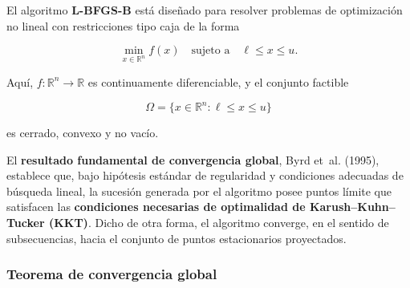 \documentclass[
  spanish,
  us-letterpaper,
  DIV=11,
  numbers=noendperiod]{scrreprt}
\numberwithin{equation}{section}
\begin{document}
El algoritmo \textbf{L-BFGS-B} está diseñado para resolver problemas de
optimización no lineal con restricciones tipo caja de la forma

\[
\min_{x \in \mathbb{R}^n} f(x)
\quad \text{sujeto a} \quad \ell \le x \le u. \tag{3.60}
\]

Aquí, \(f : \mathbb{R}^n \to \mathbb{R}\) es continuamente
diferenciable, y el conjunto factible

\[
\Omega = \{x \in \mathbb{R}^n : \ell \le x \le u\}
\]

es cerrado, convexo y no vacío.

El \textbf{resultado fundamental de convergencia global}, Byrd et~al.
(1995), establece que, bajo hipótesis estándar de regularidad y
condiciones adecuadas de búsqueda lineal, la sucesión generada por el
algoritmo posee puntos límite que satisfacen las \textbf{condiciones
necesarias de optimalidad de Karush--Kuhn--Tucker (KKT)}. Dicho de otra
forma, el algoritmo converge, en el sentido de subsecuencias, hacia el
conjunto de puntos estacionarios proyectados.

\subsubsection{Teorema de convergencia
global}\label{teorema-de-convergencia-global}
\end{document}
